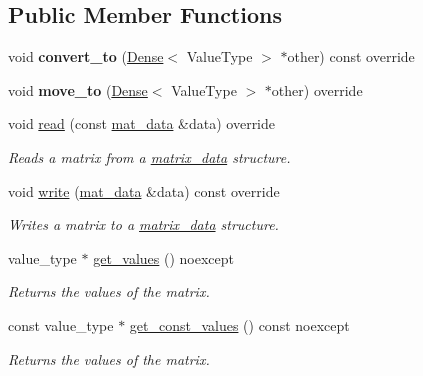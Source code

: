 \subsection*{Public Member Functions}
\begin{DoxyCompactItemize}
\item 
\mbox{\label{classgko_1_1matrix_1_1Sellp_ad7540eec38a5f267fc3078ff22ffb4d1}} 
void {\bfseries convert\+\_\+to} (\hyperlink{classgko_1_1matrix_1_1Dense}{Dense}$<$ Value\+Type $>$ $\ast$other) const override
\item 
\mbox{\label{classgko_1_1matrix_1_1Sellp_aba2fc06a17a24b8b0da36151e25357f3}} 
void {\bfseries move\+\_\+to} (\hyperlink{classgko_1_1matrix_1_1Dense}{Dense}$<$ Value\+Type $>$ $\ast$other) override
\item 
void \hyperlink{classgko_1_1matrix_1_1Sellp_a2c5ff4a3f190daf7d70bbd8451d13edd}{read} (const \hyperlink{structgko_1_1matrix__data}{mat\+\_\+data} \&data) override
\begin{DoxyCompactList}\small\item\em Reads a matrix from a \hyperlink{structgko_1_1matrix__data}{matrix\+\_\+data} structure. \end{DoxyCompactList}\item 
void \hyperlink{classgko_1_1matrix_1_1Sellp_aae2355a2866318b154d017b1c51f30a5}{write} (\hyperlink{structgko_1_1matrix__data}{mat\+\_\+data} \&data) const override
\begin{DoxyCompactList}\small\item\em Writes a matrix to a \hyperlink{structgko_1_1matrix__data}{matrix\+\_\+data} structure. \end{DoxyCompactList}\item 
value\+\_\+type $\ast$ \hyperlink{classgko_1_1matrix_1_1Sellp_ac9afd5f8000da345844ccb22b599acf7}{get\+\_\+values} () noexcept
\begin{DoxyCompactList}\small\item\em Returns the values of the matrix. \end{DoxyCompactList}\item 
const value\+\_\+type $\ast$ \hyperlink{classgko_1_1matrix_1_1Sellp_a8a3c4738049b7e6819806bb51e1a5523}{get\+\_\+const\+\_\+values} () const noexcept
\begin{DoxyCompactList}\small\item\em Returns the values of the matrix. \end{DoxyCompactList}\item 

\end{DoxyCompactItemize}
